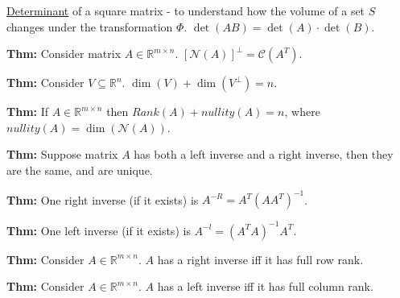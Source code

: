 \documentclass{report}
\begin{document}
\underline{Determinant} of a square matrix - to understand how the volume of a set
$S$ changes under the transformation $\Phi$. $\det(AB) = \det(A) \cdot \det(B)$.

\textbf{Thm:} Consider matrix $A \in \mathbb{R}^{m \times n}$. $[\mathcal{N}(A)]^{\perp} = \mathcal{C}(A^{T})$.

\textbf{Thm:} Consider $V \subseteq \mathbb{R}^n$. $\dim(V) + \dim(V^{\perp}) = n$.

\textbf{Thm:} If $A \in \mathbb{R}^{m \times n}$ then $Rank(A) + nullity(A) = n$, where $nullity(A) = \dim(\mathcal{N}(A))$.

\textbf{Thm:} Suppose matrix $A$ has both a left inverse and a right inverse, then they are the same, and are unique.

\textbf{Thm:} One right inverse (if it exists) is $A^{-R} = A^T(AA^T)^{-1}$.

\textbf{Thm:} One left inverse (if it exists) is $A^{-l} = (A^TA)^{-1}A^T$.

\textbf{Thm:} Consider $A \in \mathbb{R}^{m \times n}$. $A$ has a right inverse iff it has full row rank.

\textbf{Thm:} Consider $A \in \mathbb{R}^{m \times n}$. $A$ has a left inverse iff it has full column rank.
\end{document}
